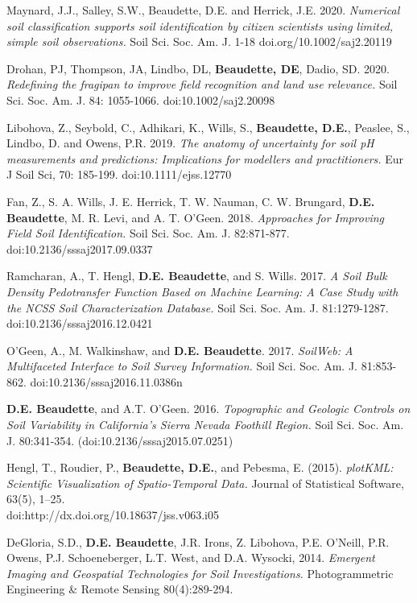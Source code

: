 \documentclass[overlapped,line,10pt,letterpaper]{res}
\begin{document}
\begin{resume}
Maynard, J.J., Salley, S.W., Beaudette, D.E. and Herrick, J.E. 2020. {\em Numerical soil classification supports soil identification by citizen scientists using limited, simple soil observations.} Soil Sci. Soc. Am. J. 1-18 doi.org/10.1002/saj2.20119

Drohan, PJ, Thompson, JA, Lindbo, DL, \textbf{Beaudette, DE}, Dadio, SD. 2020. {\em Redefining the fragipan to improve field recognition and land use relevance.} Soil Sci. Soc. Am. J. 84: 1055-1066. doi:10.1002/saj2.20098

Libohova, Z., Seybold, C., Adhikari, K., Wills, S., \textbf{Beaudette, D.E.}, Peaslee, S., Lindbo, D. and Owens, P.R. 2019. {\em The anatomy of uncertainty for soil pH measurements and predictions: Implications for modellers and practitioners.} Eur J Soil Sci, 70: 185-199. doi:10.1111/ejss.12770

Fan, Z., S. A. Wills, J. E. Herrick, T. W. Nauman, C. W. Brungard, \textbf{D.E. Beaudette}, M. R. Levi, and A. T. O’Geen. 2018. {\em Approaches for Improving Field Soil Identification.} Soil Sci. Soc. Am. J. 82:871-877. doi:10.2136/sssaj2017.09.0337

Ramcharan, A., T. Hengl, \textbf{D.E. Beaudette}, and S. Wills. 2017. {\em A Soil Bulk Density Pedotransfer Function Based on Machine Learning: A Case Study with the NCSS Soil Characterization Database.} Soil Sci. Soc. Am. J. 81:1279-1287. doi:10.2136/sssaj2016.12.0421

O’Geen, A., M. Walkinshaw, and \textbf{D.E. Beaudette}. 2017. {\em SoilWeb: A Multifaceted Interface to Soil Survey Information.} Soil Sci. Soc. Am. J. 81:853-862. doi:10.2136/sssaj2016.11.0386n

\textbf{D.E. Beaudette}, and A.T. O’Geen. 2016. {\em Topographic and Geologic Controls on Soil Variability in California’s Sierra Nevada Foothill Region.} Soil Sci. Soc. Am. J. 80:341-354. (doi:10.2136/sssaj2015.07.0251)

Hengl, T., Roudier, P., \textbf{Beaudette, D.E.}, and Pebesma, E. (2015). {\em plotKML: Scientific Visualization of Spatio-Temporal Data.} Journal of Statistical Software, 63(5), 1--25. \\
doi:http://dx.doi.org/10.18637/jss.v063.i05

DeGloria, S.D., \textbf{D.E. Beaudette}, J.R. Irons, Z. Libohova, P.E. O’Neill, P.R. Owens, P.J. Schoeneberger, L.T. West, and D.A. Wysocki, 2014. {\em Emergent Imaging and Geospatial Technologies for Soil Investigations.} Photogrammetric Engineering \& Remote Sensing 80(4):289-294.


\end{resume}
\end{document}
